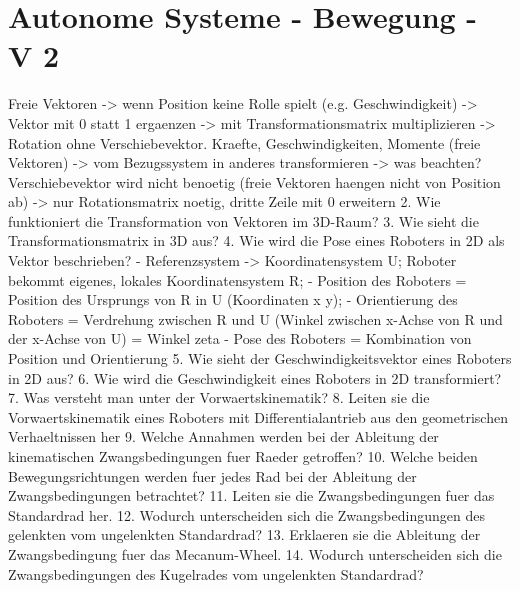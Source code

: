 \documentclass[11pt]{article}
\begin{document}
    \section{Autonome Systeme - Bewegung - V 2}\label{sec:vtwo}
    Freie Vektoren -> wenn Position keine Rolle spielt (e.g. Geschwindigkeit) -> Vektor mit 0 statt 1 ergaenzen -> mit Transformationsmatrix multiplizieren -> Rotation ohne Verschiebevektor. Kraefte, Geschwindigkeiten, Momente (freie Vektoren) -> vom Bezugssystem in anderes transformieren -> was beachten?
    Verschiebevektor wird nicht benoetig (freie Vektoren haengen nicht von Position ab) -> nur Rotationsmatrix noetig, dritte Zeile mit 0 erweitern
    2. Wie funktioniert die Transformation von Vektoren im 3D-Raum?
    3. Wie sieht die Transformationsmatrix in 3D aus?
    4. Wie wird die Pose eines Roboters in 2D als Vektor beschrieben?
    - Referenzsystem -> Koordinatensystem U; Roboter bekommt eigenes, lokales Koordinatensystem R;
    - Position des Roboters = Position des Ursprungs von R in U (Koordinaten x y);
    - Orientierung des Roboters = Verdrehung zwischen R und U (Winkel zwischen  x-Achse von R und der x-Achse von U) = Winkel zeta
    - Pose des Roboters = Kombination von Position und Orientierung
    5. Wie sieht der Geschwindigkeitsvektor eines Roboters in 2D aus?
    6. Wie wird die Geschwindigkeit eines Roboters in 2D transformiert?
    7. Was versteht man unter der Vorwaertskinematik?
    8. Leiten sie die Vorwaertskinematik eines Roboters mit Differentialantrieb aus den geometrischen Verhaeltnissen her
    9. Welche Annahmen werden bei der Ableitung der kinematischen Zwangsbedingungen fuer Raeder getroffen?
    10. Welche beiden Bewegungsrichtungen werden fuer jedes Rad bei der Ableitung der Zwangsbedingungen betrachtet?
    11. Leiten sie die Zwangsbedingungen fuer das Standardrad her.
    12. Wodurch unterscheiden sich die Zwangsbedingungen des gelenkten vom ungelenkten Standardrad?
    13. Erklaeren sie die Ableitung der Zwangsbedingung fuer das Mecanum-Wheel.
    14. Wodurch unterscheiden sich die Zwangsbedingungen des Kugelrades vom ungelenkten Standardrad?
\end{document}
